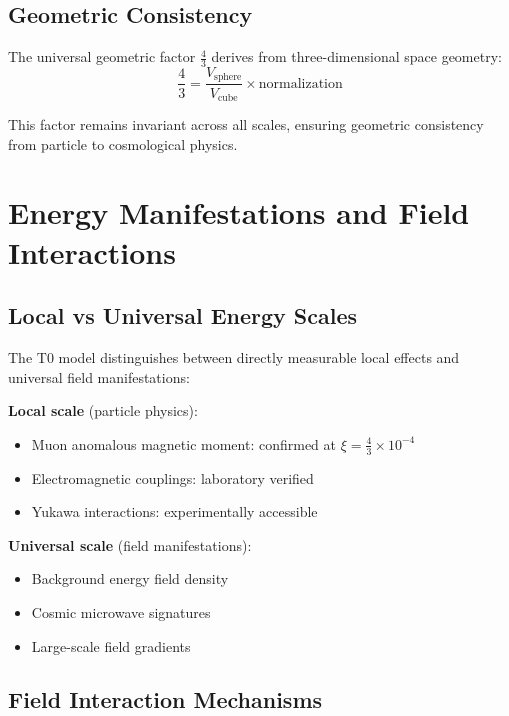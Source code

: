 \documentclass[12pt,a4paper]{article}
\begin{document}
	\subsection{Geometric Consistency}
	\label{subsec:geometric_consistency}
	
	The universal geometric factor $\frac{4}{3}$ derives from three-dimensional space geometry:
	\begin{equation}
		\frac{4}{3} = \frac{V_{\text{sphere}}}{V_{\text{cube}}} \times \text{normalization}
	\end{equation}
	
	This factor remains invariant across all scales, ensuring geometric consistency from particle to cosmological physics.
	
	\section{Energy Manifestations and Field Interactions}
	\label{sec:energy_manifestations}
	
	\subsection{Local vs Universal Energy Scales}
	\label{subsec:local_universal}
	
	The T0 model distinguishes between directly measurable local effects and universal field manifestations:
	
	\textbf{Local scale} (particle physics):
	\begin{itemize}
		\item Muon anomalous magnetic moment: confirmed at $\xi = \frac{4}{3} \times 10^{-4}$
		\item Electromagnetic couplings: laboratory verified
		\item Yukawa interactions: experimentally accessible
	\end{itemize}
	
	\textbf{Universal scale} (field manifestations):
	\begin{itemize}
		\item Background energy field density
		\item Cosmic microwave signatures
		\item Large-scale field gradients
	\end{itemize}
	
	\subsection{Field Interaction Mechanisms}
	\label{subsec:interaction_mechanisms}
	
\end{document}

